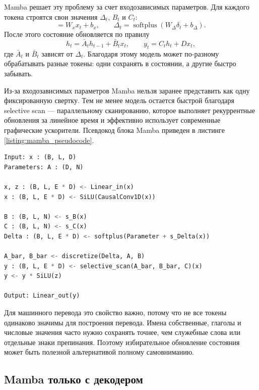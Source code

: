 Mamba решает эту проблему за счет входозависимых параметров.
Для каждого токена строятся свои значения $\Delta_t$, $B_t$ и $C_t$:
\begin{equation}
    [\delta_t, B_t, C_t] = W_x x_t + b_x, \qquad
    \Delta_t = \operatorname{softplus}(W_{\Delta}\delta_t + b_{\Delta}).
\end{equation}
После этого состояние обновляется по правилу
\begin{equation}
    h_t = \bar{A}_t h_{t-1} + \bar{B}_t x_t, \qquad
    y_t = C_t h_t + D x_t,
\end{equation}
где $\bar{A}_t$ и $\bar{B}_t$ зависят от $\Delta_t$.
Благодаря этому модель может по-разному обрабатывать разные токены: одни сохранять в состоянии, а другие быстро забывать.

Из-за входозависимых параметров Mamba нельзя заранее представить как одну фиксированную свертку.
Тем не менее модель остается быстрой благодаря selective scan --- параллельному сканированию, которое выполняет рекуррентные обновления за линейное время и эффективно использует современные графические ускорители.
Псевдокод блока Mamba приведен в листинге \ref{listing:mamba_pseudocode}.

\begin{lstlisting}[language=Python, caption={Основные операции блока Mamba}, label={listing:mamba_pseudocode}]
Input: x : (B, L, D)
Parameters: A : (D, N)

x, z : (B, L, E * D) <- Linear_in(x)
x : (B, L, E * D) <- SiLU(CausalConv1D(x))

B : (B, L, N) <- s_B(x)
C : (B, L, N) <- s_C(x)
Delta : (B, L, E * D) <- softplus(Parameter + s_Delta(x))

A_bar, B_bar <- discretize(Delta, A, B)
y : (B, L, E * D) <- selective_scan(A_bar, B_bar, C)(x)
y <- y * SiLU(z)

Output: Linear_out(y)
\end{lstlisting}

Для машинного перевода это свойство важно, потому что не все токены одинаково значимы для построения перевода.
Имена собственные, глаголы и числовые значения часто нужно сохранять точнее, чем служебные слова или отдельные знаки препинания.
Поэтому избирательное обновление состояния может быть полезной альтернативой полному самовниманию.

\subsection{Mamba только с декодером}

